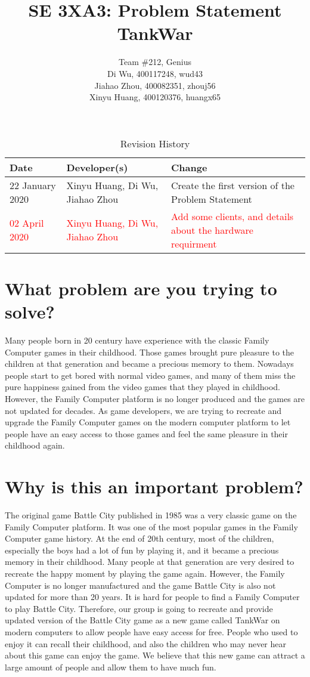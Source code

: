\documentclass{article}
\title{SE 3XA3: Problem Statement\\TankWar}
\author{Team \#212, Genius
		\\Di Wu, 400117248, wud43 
		\\Jiahao Zhou, 400082351, zhouj56 
		\\Xinyu Huang, 400120376, huangx65
}
\date{}
\begin{document}
\begin{table}[hp]
\caption{Revision History} \label{TblRevisionHistory}
\begin{tabularx}{\textwidth}{llX}
\toprule
\textbf{Date} & \textbf{Developer(s)} & \textbf{Change}\\
\midrule
22 January 2020 & Xinyu Huang, Di Wu, Jiahao Zhou & Create the first version of the Problem Statement\\
\textcolor{red}{02 April 2020} & \textcolor{red}{Xinyu Huang, Di Wu, Jiahao Zhou} & \textcolor{red}{Add some clients, and details about the hardware requirment}\\
\bottomrule
\end{tabularx}
\end{table}

\newpage

\maketitle

\section{What problem are you trying to solve?}
\newcommand*\apos{\textsc{\char13}}
Many people born in 20 century have experience with the classic Family Computer games in their childhood. Those games brought pure pleasure to the children at that generation and became a precious memory to them. Nowadays people start to get bored with normal video games, and many of them miss the pure happiness gained from the video games that they played in childhood. However, the Family Computer platform is no longer produced and the games are not updated for decades. As game developers, we are trying to recreate and upgrade the Family Computer games on the modern computer platform to let people have an easy access to those games and feel the same pleasure in their childhood again.

\section{Why is this an important problem?}

The original game Battle City published in 1985 was a very classic game on the Family Computer platform. It was one of the most popular games in the Family Computer game history. At the end of 20th century, most of the children, especially the boys had a lot of fun by playing it, and it became a precious memory in their childhood.  Many people at that generation are very desired to recreate the happy moment by playing the game again. However, the Family Computer is no longer manufactured and the game Battle City is also not updated for more than 20 years. It is hard for people to find a Family Computer to play Battle City. Therefore, our group is going to recreate and provide updated version of the Battle City game as a new game called TankWar on modern computers to allow people have easy access for free. People who used to enjoy it can recall their childhood, and also the children who may never hear about this game can enjoy the game. We believe that this new game can attract a large amount of people and allow them to have much fun. 
\end{document}
